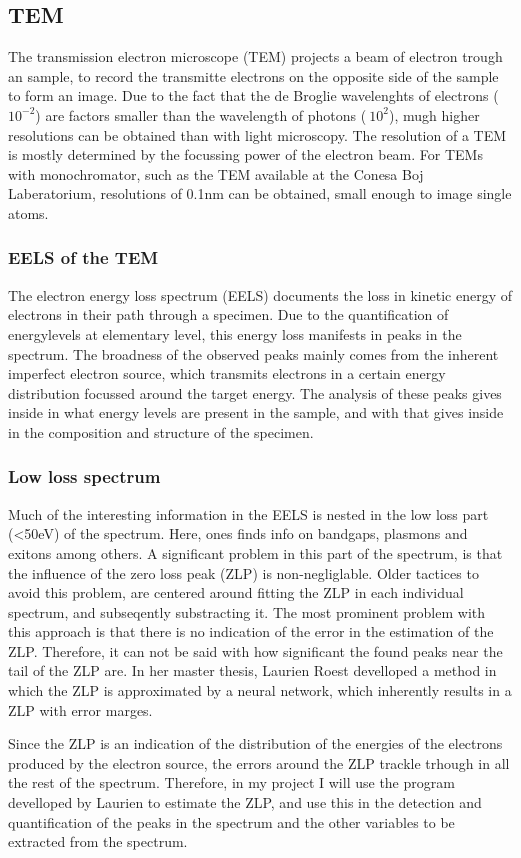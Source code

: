 \subsection{TEM} %
\label{ssub:tem}
The transmission electron microscope (TEM) projects a beam of electron trough an sample, to record the transmitte electrons on the opposite side of the sample to form an image. Due to the fact that the de Broglie wavelenghts of electrons (~$10^{-2}$) are factors smaller than the wavelength of photons ($~10^2$), mugh higher resolutions can be obtained than with light microscopy. The resolution of a TEM is mostly determined by the focussing power of the electron beam. For TEMs with monochromator, such as the TEM available at the Conesa Boj Laberatorium, resolutions of 0.1nm can be obtained, small enough to image single atoms.




\subsubsection{EELS of the TEM}
The electron energy loss spectrum (EELS) documents the loss in kinetic energy of electrons in their path through a specimen. Due to the quantification of energylevels at elementary level, this energy loss manifests in peaks in the spectrum. The broadness of the observed peaks mainly comes from the inherent imperfect electron source, which transmits electrons in a certain energy distribution focussed around the target energy. The analysis of these peaks gives inside in what energy levels are present in the sample, and with that gives inside in the composition and structure of the specimen.




\subsubsection{Low loss spectrum}
Much of the interesting information in the EELS is nested in the low loss part (<50eV) of the spectrum. Here, ones finds info on bandgaps, plasmons and exitons among others. A significant problem in this part of the spectrum, is that the influence of the zero loss peak (ZLP) is non-negliglable. Older tactices to avoid this problem, are centered around fitting the ZLP in each individual spectrum, and subseqently substracting it. The most prominent problem with this approach is that there is no indication of the error in the estimation of the ZLP. Therefore, it can not be said with how significant the found peaks near the tail of the ZLP are. In her master thesis, Laurien Roest develloped a method in which the ZLP is approximated by a neural network, which inherently results in a ZLP with error marges. 

Since the ZLP is an indication of the distribution of the energies of the electrons produced by the electron source, the errors around the ZLP trackle trhough in all the rest of the spectrum. Therefore, in my project I will use the program develloped by Laurien to estimate the ZLP, and use this in the detection and quantification of the peaks in the spectrum and the other variables to be extracted from the spectrum.